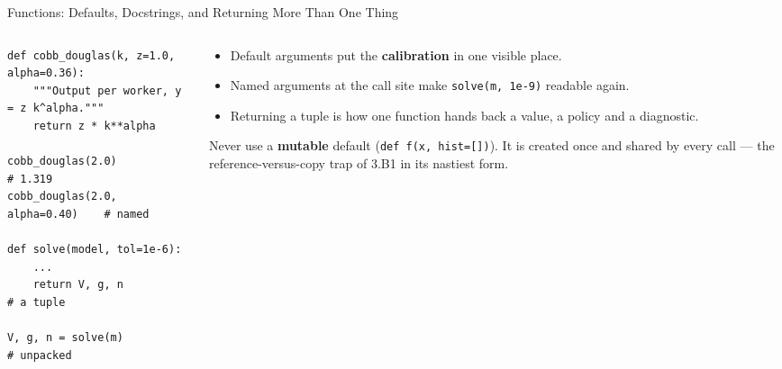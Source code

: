 \begin{frame}[fragile]{Functions: Defaults, Docstrings, and Returning More Than One Thing}
\begin{columns}[T]
\begin{column}{0.54\textwidth}
\begin{lstlisting}
def cobb_douglas(k, z=1.0, alpha=0.36):
    """Output per worker, y = z k^alpha."""
    return z * k**alpha

cobb_douglas(2.0)                # 1.319
cobb_douglas(2.0, alpha=0.40)    # named

def solve(model, tol=1e-6):
    ...
    return V, g, n               # a tuple

V, g, n = solve(m)               # unpacked
\end{lstlisting}
\end{column}
\begin{column}{0.43\textwidth}
\small
\begin{itemize}\footnotesize
  \item Default arguments put the \textbf{calibration} in one visible place.
  \item Named arguments at the call site make \texttt{solve(m, 1e-9)} readable again.
  \item Returning a tuple is how one function hands back a value, a policy and a diagnostic.
\end{itemize}
\medskip
\begin{cautionbox}\footnotesize
Never use a \textbf{mutable} default (\texttt{def f(x, hist=[])}). It is created once and shared by every call --- the reference-versus-copy trap of 3.B1 in its nastiest form.
\end{cautionbox}
\end{column}
\end{columns}
\vspace{1mm}
\end{frame}

